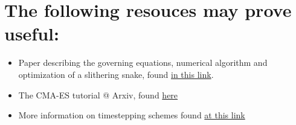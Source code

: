 \documentclass[11pt]{article}
\begin{document}
\section{The following resouces may prove useful:}
\label{sec:references}
\begin{itemize}
\item Paper describing the governing equations, numerical algorithm and optimization
of a slithering snake, found \href{https://royalsocietypublishing.org/doi/full/10.1098/rsos.171628}{in this link}.
\item The CMA-ES tutorial @ Arxiv, found \href{https://arxiv.org/pdf/1604.00772.pdf}{here}
\item More information on timestepping schemes found \href{https://cg.informatik.uni-freiburg.de/course\_notes/sim\_02\_particles.pdf}{at this link}
\end{itemize}
\end{document}
